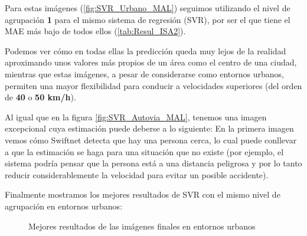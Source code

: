 Para estas imágenes (\ref{fig:SVR_Urbano_MAL}) seguimos utilizando el nivel de agrupación \textbf{1} para el mismo sistema de regresión (\ac{SVR}), por ser el que tiene el \ac{MAE} más bajo de todos ellos (\ref{tab:Resul_ISA2}).

Podemos ver cómo en todas ellas la predicción queda muy lejos de la realidad aproximando unos valores más propios de un área como el centro de una ciudad, mientras que estas imágenes, a pesar de considerarse como entornos urbanos, permiten una mayor flexibilidad para conducir a velocidades superiores (del orden de \textbf{40} o \textbf{50 km/h}).

Al igual que en la figura \ref{fig:SVR_Autovia_MAL}, tenemos una imagen excepcional cuya estimación puede deberse a lo siguiente: En la primera imagen vemos cómo Swiftnet detecta que hay una persona cerca, lo cual puede conllevar a que la estimación se haga para una situación que no existe (por ejemplo, el sistema podría pensar que la persona está a una distancia peligrosa y por lo tanto reducir considerablemente la velocidad para evitar un posible accidente).

Finalmente mostramos los mejores resultados de \ac{SVR} con el mismo nivel de agrupación en entornos urbanos:

\begin{figure}[H]
\centering
  \begin{subfigure}[b]{0.45\linewidth}
  \end{subfigure}
  \begin{subfigure}[b]{0.45\linewidth}
  \end{subfigure}
  \begin{subfigure}[b]{0.45\linewidth}
  \end{subfigure}
  \begin{subfigure}[b]{0.45\linewidth}
  \end{subfigure}
  \caption{Mejores resultados de las imágenes finales en entornos urbanos}
  \label{fig:SVR_Urbano_BIEN}
\end{figure}

